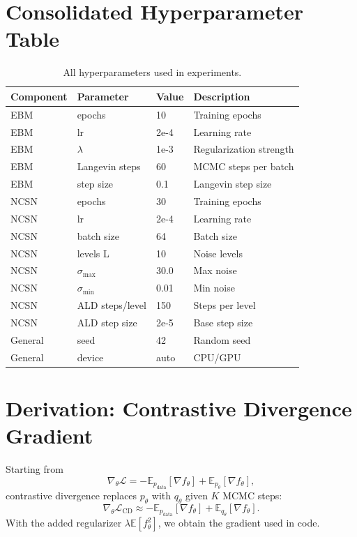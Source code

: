 \documentclass[a4paper,12pt]{article}
\begin{document}
\section{Consolidated Hyperparameter Table}
\begin{table}[H]
\centering
\caption{All hyperparameters used in experiments.}
\label{tab:all_hyperparams}
\begin{tabular}{@{}llll@{}}
\toprule
Component & Parameter & Value & Description \\
\midrule
EBM & epochs & 10 & Training epochs \\
EBM & lr & 2e-4 & Learning rate \\
EBM & $\lambda$ & 1e-3 & Regularization strength \\
EBM & Langevin steps & 60 & MCMC steps per batch \\
EBM & step size & 0.1 & Langevin step size \\
NCSN & epochs & 30 & Training epochs \\
NCSN & lr & 2e-4 & Learning rate \\
NCSN & batch size & 64 & Batch size \\
NCSN & levels L & 10 & Noise levels \\
NCSN & $\sigma_{\max}$ & 30.0 & Max noise \\
NCSN & $\sigma_{\min}$ & 0.01 & Min noise \\
NCSN & ALD steps/level & 150 & Steps per level \\
NCSN & ALD step size & 2e-5 & Base step size \\
General & seed & 42 & Random seed \\
General & device & auto & CPU/GPU \\
\bottomrule
\end{tabular}
\end{table}

\section{Derivation: Contrastive Divergence Gradient}
Starting from
\begin{equation}
    \nabla_\theta \mathcal{L} = - \mathbb{E}_{p_{\text{data}}}[\nabla f_\theta] + \mathbb{E}_{p_\theta}[\nabla f_\theta],
\end{equation}
contrastive divergence replaces $p_\theta$ with $q_\theta$ given $K$ MCMC steps:
\begin{equation}
    \nabla_\theta \mathcal{L}_{\text{CD}} \approx - \mathbb{E}_{p_{\text{data}}}[\nabla f_\theta] + \mathbb{E}_{q_\theta}[\nabla f_\theta].
\end{equation}
With the added regularizer $\lambda \mathbb{E}[f_\theta^2]$, we obtain the gradient used in code.
\end{document}
